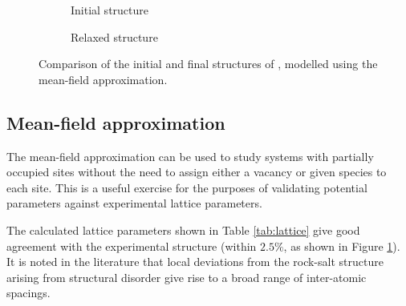 \newpage
\begin{figure}[h]
\centering
\begin{subfigure}{0.5\textwidth}
\caption{Initial structure}
\end{subfigure}%
\begin{subfigure}{0.5\textwidth}
\caption{Relaxed structure}
\end{subfigure}	
\caption{Comparison of the initial and final structures of , modelled using the mean-field approximation.}
\label{fig:pointlesscomparison}
\end{figure}

\subsection{Mean-field approximation}
The mean-field approximation can be used to study systems with partially occupied sites without the need to assign either a vacancy or given species to each site.
This is a useful exercise for the purposes of validating potential parameters against experimental lattice parameters.

The calculated lattice parameters shown in Table \ref{tab:lattice} give good agreement with the experimental structure (within $2.5\%$, as shown in Figure \ref{fig:pointlesscomparison}).
It is noted in the literature that local deviations from the rock-salt structure arising from structural disorder give rise to a broad range of inter-atomic spacings.\cite{Yahia2019}



